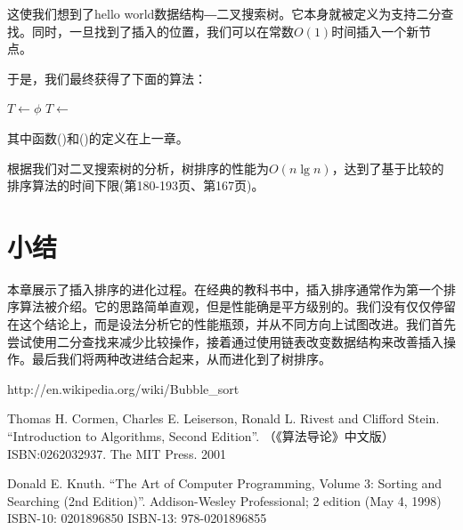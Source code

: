 \documentclass[UTF8]{article}
\begin{document}
这使我们想到了hello world数据结构―二叉搜索树。它本身就被定义为支持二分查找。同时，一旦找到了插入的位置，我们可以在常数$O(1)$时间插入一个新节点。

于是，我们最终获得了下面的算法：

\begin{algorithmic}[1]
  \State $T \gets \phi$
    \State $T \gets $ 
  \EndFor
  \State \Return {}
\EndFunction
\end{algorithmic}

其中函数()和()的定义在上一章。

根据我们对二叉搜索树的分析，树排序的性能为$O(n \lg n)$，达到了基于比较的排序算法的时间下限(\cite{Knuth-V3}第180-193页、\cite{CLRS}第167页)。

\section{小结}
本章展示了插入排序的进化过程。在经典的教科书中，插入排序通常作为第一个排序算法被介绍。它的思路简单直观，但是性能确是平方级别的。我们没有仅仅停留在这个结论上，而是设法分析它的性能瓶颈，并从不同方向上试图改进。我们首先尝试使用二分查找来减少比较操作，接着通过使用链表改变数据结构来改善插入操作。最后我们将两种改进结合起来，从而进化到了树排序。

\ifx\wholebook\relax \else
\begin{thebibliography}{99}

http://en.wikipedia.org/wiki/Bubble\_sort

Thomas H. Cormen, Charles E. Leiserson, Ronald L. Rivest and Clifford Stein.
``Introduction to Algorithms, Second Edition''. （《算法导论》中文版）ISBN:0262032937. The MIT Press. 2001

Donald E. Knuth. ``The Art of Computer Programming, Volume 3: Sorting and Searching (2nd Edition)''. Addison-Wesley Professional; 2 edition (May 4, 1998) ISBN-10: 0201896850 ISBN-13: 978-0201896855

\end{thebibliography}
\end{document}
